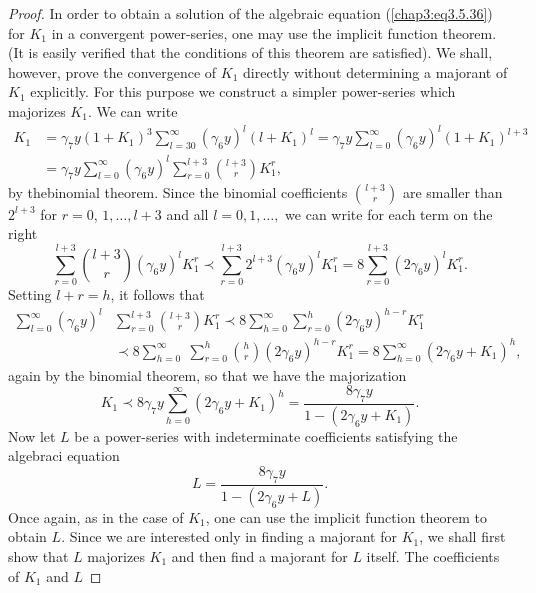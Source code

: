 \begin{proof}
In order to obtain a solution of the algebraic equation
(\ref{chap3:eq3.5.36}) for $K_1$ in a convergent power-series, one may
use the implicit function theorem. (It is easily verified that the
conditions of this theorem are satisfied). We shall, however, prove
the convergence of $K_1$ directly without determining a majorant of
$K_1$ explicitly. For this purpose we construct a simpler power-series
which majorizes $K_1$. We can write 
\begin{align*}
K_1 & = \gamma_7 y(1+K_1)^3 \sum\limits^\infty_{l=30} (\gamma_6y)^l
(l+K_1)^l = \gamma_7 y \sum\limits^\infty_{l=0} (\gamma_6 y)^l (1+
K_1)^{l+3}\\ 
& = \gamma_7 y\sum\limits^\infty_{l=0} (\gamma_6 y)^l
\sum\limits^{l+3}_{r=0} \binom{l+3}{r} K^r_1, 
\end{align*} 
by the\pageoriginale binomial theorem. Since the binomial coefficients
$\binom{l+3}{r}$ are sma\-ller than $2^{l+3}$ for $r =0$, $1, \ldots,
l+3$ and all $l = 0, 1, \ldots,$ we can write for each term on the
right 
$$
\sum\limits^{l+3}_{r=0} \binom{l+3}{r} (\gamma_6y)^l K^r_1 \prec
\sum\limits^{l+3}_{r=0} 2^{l+3} (\gamma_6 y)^l K^r_1 = 8
\sum\limits^{l+3}_{r=0} (2 \gamma_6 y)^l K^r_1.  
$$
Setting $l+r =h$, it follows that 
\begin{align*}
\sum\limits^\infty_{l=0} (\gamma_6 y)^l & \sum\limits^{l+3}_{r=0}
\binom{l+3}{r} K^r_1 \prec 8 \sum\limits^\infty_{h=0}
\sum\limits^h_{r=0} (2\gamma_6 y)^{h-r} K^r_1\\ 
& \prec 8 \sum\limits^\infty_{h=0} \; \sum\limits^h_{r=0} \binom{h}{r}
(2\gamma_6 y)^{h-r} K^r_1 = 8 \sum\limits^\infty_{h=0} (2\gamma_6 y +
K_1)^h,  
\end{align*}
again by the binomial theorem, so that we have the majorization 
\begin{equation*}
K_1 \prec8 \gamma_7 y \sum\limits^\infty_{h=0} (2\gamma_6 y + K_1)^h =
\frac{8\gamma_7 y}{1-(2\gamma_6 y + K_1)}
. \tag{3.5.37}\label{chap3:eq3.5.37} 
\end{equation*}
Now let $L$ be a power-series with indeterminate coefficients
satisfying the algebraci equation 
\begin{equation*}
L = \frac{8\gamma_7 y}{1 - (2\gamma_6 y +
  L)}. \tag{3.5.38}\label{chap3:eq3.5.38} 
\end{equation*}
Once again, as in the case of $K_1$, one can use the implicit function
theorem to obtain $L$. Since we are interested only in finding a
majorant for $K_1$, we shall first show that $L$ majorizes $K_1$ and
then find a majorant for $L$ itself. The coefficients of $K_1$ and $L$

\end{proof}
